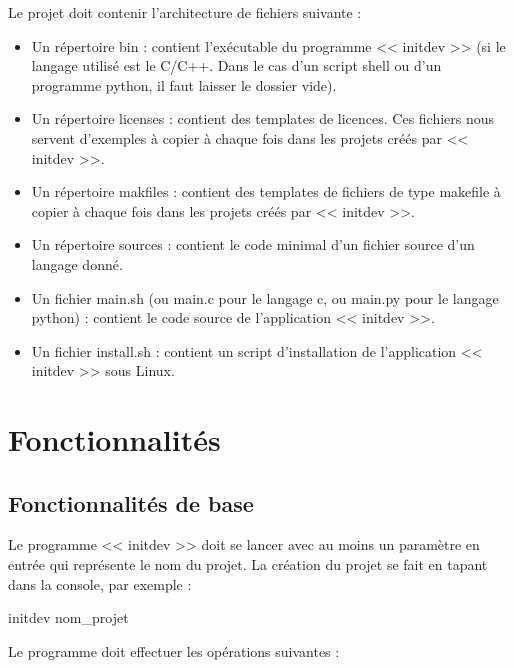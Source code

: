 \documentclass[10pt,a4paper]{article}
\begin{document}
Le projet doit contenir l'architecture de fichiers suivante : 
\begin{itemize}
  \item Un répertoire bin : contient l'exécutable du programme << initdev >> (si le langage utilisé est le C/C++. Dans le cas d'un script shell ou d'un programme python, il faut laisser le dossier vide).
  \item Un répertoire licenses : contient des templates de licences. Ces fichiers nous servent d'exemples à copier à chaque fois dans les projets créés par << initdev >>.
  \item Un répertoire makfiles : contient des templates de fichiers de type makefile à copier à chaque fois dans les projets créés par << initdev >>. 
  \item Un répertoire sources : contient le code minimal d'un fichier source d'un langage donné. 
  \item Un fichier main.sh (ou main.c pour le langage c, ou main.py pour le langage python) : contient le code source de l'application << initdev >>. 
  \item Un fichier install.sh : contient un script d'installation de l'application << initdev >> sous Linux.
\end{itemize}


\section{Fonctionnalités}
\label{sec:fct}
\subsection{Fonctionnalités de base}
Le programme << initdev >> doit se lancer avec au moins un paramètre en entrée qui représente le nom du projet. La création du projet se fait en tapant dans la console, par exemple : 
  \begin{center}
    initdev nom\_projet
  \end{center}
  
  Le programme doit effectuer les opérations suivantes :
\end{document}

